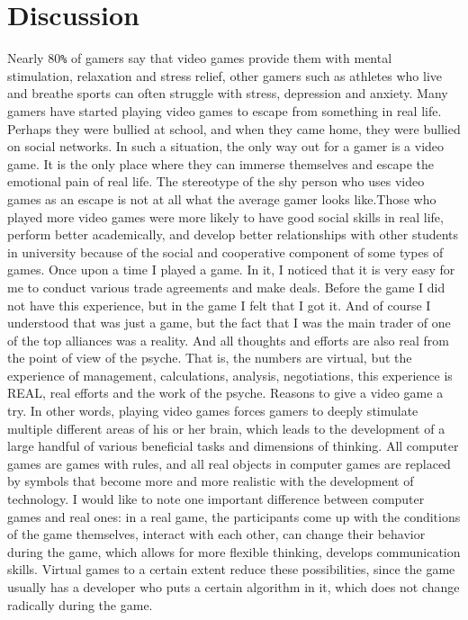 \documentclass[10pt,twoside,slovak,a4paper]{article}
\begin{document}
\section{Discussion} \label{}
Nearly 80\texttt{\%} of gamers say that video games provide them with mental stimulation, relaxation and stress relief, other gamers such as athletes who live and breathe sports can often struggle with stress, depression and anxiety. Many gamers have  started playing video games to escape from something in real life. Perhaps they were bullied at school,  and when they came home, they were bullied on social networks. In such a situation, the only way out for a gamer is a video game. It is the only place where they can immerse themselves and  escape  the emotional pain of real life. The stereotype of the shy person who uses video games as an escape  is  not  at all what the average gamer looks like.\newline Those who played more video games were more likely to have good social skills in real life, perform better academically, and develop better relationships with other students in university because of the social and cooperative component of some types of games. Once upon a time I played a game. In it, I noticed that it is very easy for me to conduct various trade agreements and make deals. Before the game I did not have this experience, but in the game I felt that I got it. And of course I understood that was just a game, but the fact that I was the main trader of one of the top alliances was a reality. And all thoughts and efforts are also real from the point of view of the psyche. That is, the numbers are virtual, but the experience of management, calculations, analysis, negotiations, this experience is REAL, real efforts and the work of the psyche. Reasons to give a video game a try\cite{Geico.com}. \newline In other words, playing video games forces gamers to deeply stimulate multiple different areas of his or her brain, which leads to the development of a large handful of various beneficial tasks and dimensions of thinking. All computer games are games with rules, and all real objects in computer games are replaced by symbols that become more and more realistic with the development of technology. I would like to note one important difference between computer games and real ones: in a real game, the participants come up with the conditions of the game themselves, interact with each other, can change their behavior during the game, which allows for more flexible thinking, develops communication skills. Virtual games to a certain extent reduce these possibilities, since the game usually has a developer who puts a certain algorithm in it, which does not change radically during the game. 
\end{document}
